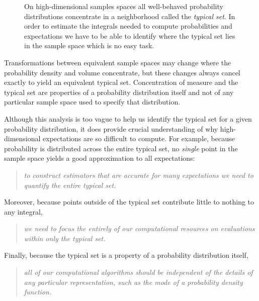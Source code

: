 \documentclass[11pt, oneside]{article}
\begin{document}
\begin{figure*}
\centering
{}
\caption{On high-dimensional samples spaces all well-behaved probability 
distributions concentrate in a neighborhood called the \emph{typical set}.  
In order to estimate the integrals needed to compute probabilities and 
expectations we have to be able to identify where the typical set lies in 
the sample space which is no easy task.
}
\label{fig:typical_set}
\end{figure*}

Transformations between equivalent sample spaces may change where 
the probability density and volume concentrate, but these changes always 
cancel exactly to yield an equivalent typical set.  Concentration of measure 
and the typical set are properties of a probability distribution itself and not 
of any particular sample space used to specify that distribution.

Although this analysis is too vague to help us identify the typical set
for a given probability distribution, it does provide crucial understanding 
of why high-dimensional expectations are so difficult to compute.  For 
example, because probability is distributed across the entire typical set, 
no \emph{single} point in the sample space yields a good approximation 
to all expectations:
%
\begin{quote}
\emph{to construct estimators that are accurate for many expectations 
we need to quantify the entire typical set.}
\end{quote}
%
Moreover, because points outside of the typical set contribute little to 
nothing to any integral,
%
\begin{quote}
\emph{we need to focus the entirely of our computational resources on 
evaluations within only the typical set.}
\end{quote}
%  
Finally, because the typical set is a property of a probability distribution 
itself,
%
\begin{quote}
\emph{all of our computational algorithms should be independent of the 
details of any particular representation,  such as the mode of a probability 
density function.}
\end{quote}
\end{document}
